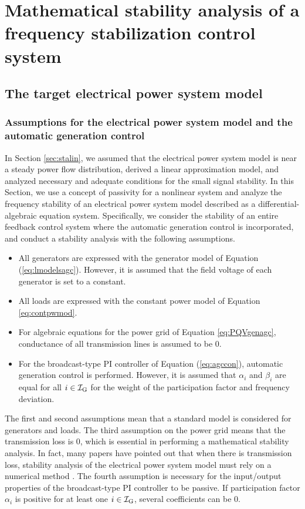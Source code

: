 \documentclass[graybox, envcountchap]{svmult}
\begin{document}
\section{Mathematical stability analysis of a frequency stabilization control system\advanced}\label{sec:mathnpas}

\subsection{The target electrical power system model\advanced}\label{sec:objmod}

\smallskip
\subsubsection{Assumptions for the electrical power system model and the automatic generation control}

In Section \ref{sec:stalin}, we assumed that the electrical power system model is near a steady power flow distribution, derived a linear approximation model, and analyzed necessary and adequate conditions for the small signal stability.
In this Section, we use a concept of passivity for a nonlinear system and analyze the frequency stability of an electrical power system model described as a differential-algebraic equation system.
Specifically, we consider the stability of an entire feedback control system where the automatic generation control is incorporated, and conduct a stability analysis with the following assumptions.

\begin{itemize}
\item All generators are expressed with the generator model of Equation (\ref{eq:lmodelsagc}). However, it is assumed that the field voltage of each generator is set to a constant.
\item All loads are expressed with the constant power model of Equation \ref{eq:contpwmod}.
\item For algebraic equations for the power grid of Equation \ref{eq:PQVgenagc}, conductance of all transmission lines is assumed to be 0.
\item For the broadcast-type PI controller of Equation (\ref{eq:agccon}), automatic generation control is performed.
However, it is assumed that $\alpha_i$ and $\beta_i$ are equal for all $i\in \mathcal{I}_{\rm G}$ for the weight of the participation factor and
frequency deviation.
\end{itemize}

The first and second assumptions mean that a standard model is considered for generators and loads.
The third assumption on the power grid means that the transmission loss is 0, which is essential in performing a mathematical stability analysis.
In fact, many papers have pointed out that when there is transmission loss, stability analysis of the electrical power system model must rely on a numerical method \cite{narasimhamurthi1984existence,chang1995direct,chiang2011direct,yang2019distributed}.
The fourth assumption is necessary for the input/output properties of the broadcast-type PI controller to be passive.
If participation factor $\alpha_i$ is positive for at least one $i\in \mathcal{I}_{\rm G}$, several coefficients can be 0.
\end{document}
